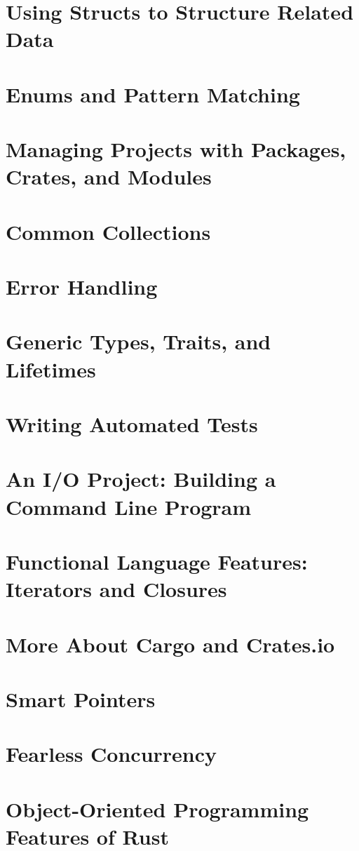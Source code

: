 \documentclass{beamer}
\begin{document}
\section{Using Structs to Structure Related Data}
\section{Enums and Pattern Matching}
\section{Managing Projects with Packages, Crates, and Modules}
\section{Common Collections}
\section{Error Handling}
\section{Generic Types, Traits, and Lifetimes}
\section{Writing Automated Tests}
\section{An I/O Project: Building a Command Line Program}
\section{Functional Language Features: Iterators and Closures}
\section{More About Cargo and Crates.io}
\section{Smart Pointers}
\section{Fearless Concurrency}
\section{Object-Oriented Programming Features of Rust}
\end{document}
